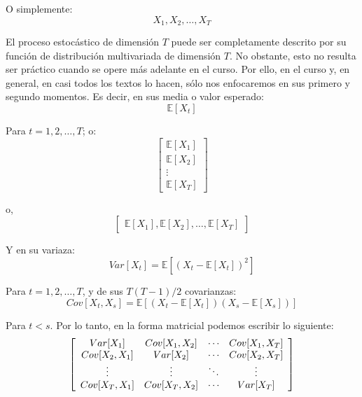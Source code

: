 \documentclass[
]{book}
\begin{document}
O simplemente:
\begin{equation}
    X_1, X_2, \ldots, X_T
    \label{eq:Serie3}
\end{equation}

El proceso estocástico de dimensión \(T\) puede ser completamente descrito por su función de distribución multivariada de dimensión \(T\). No obstante, esto no resulta ser práctico cuando se opere más adelante en el curso. Por ello, en el curso y, en general, en casi todos los textos lo hacen, sólo nos enfocaremos en sus primero y segundo momentos. Es decir, en sus media o valor esperado:
\begin{equation*}
    \mathbb{E}[X_t]
\end{equation*}

Para \(t = 1, 2, \ldots, T\); o:
\begin{equation*}
\left[
    \begin{array}{c}
    \mathbb{E}[X_1] \\
    \mathbb{E}[X_2] \\
    \vdots \\
    \mathbb{E}[X_T]
    \end{array}
\right]
\end{equation*}

o,
\begin{equation*}
\left[
    \begin{array}{c}
    \mathbb{E}[X_1], \mathbb{E}[X_2], \ldots, \mathbb{E}[X_T]
    \end{array}
\right]
\end{equation*}

Y en su variaza:
\begin{equation*}
    Var[X_t] = \mathbb{E}[(X_t - \mathbb{E}[X_t])^2]
\end{equation*}

Para \(t = 1, 2, \ldots, T\), y de sus \(T(T-1)/2\) covarianzas:
\begin{equation*}
    Cov[X_t,X_s] = \mathbb{E}[(X_t - \mathbb{E}[X_t])(X_s - \mathbb{E}[X_s])]
\end{equation*}

Para \(t < s\). Por lo tanto, en la forma matricial podemos escribir lo siguiente:
\begin{equation*}
\left[
    \begin{array}{c c c c}
    Var[X_1] & Cov[X_1,X_2] & \cdots & Cov[X_1,X_T] \\
    Cov[X_2,X_1] & Var[X_2] & \cdots & Cov[X_2,X_T] \\
    \vdots & \vdots & \ddots & \vdots \\
    Cov[X_T,X_1] & Cov[X_T,X_2] & \cdots & Var[X_T] \\
    \end{array}
\right]
\end{equation*}
\end{document}

